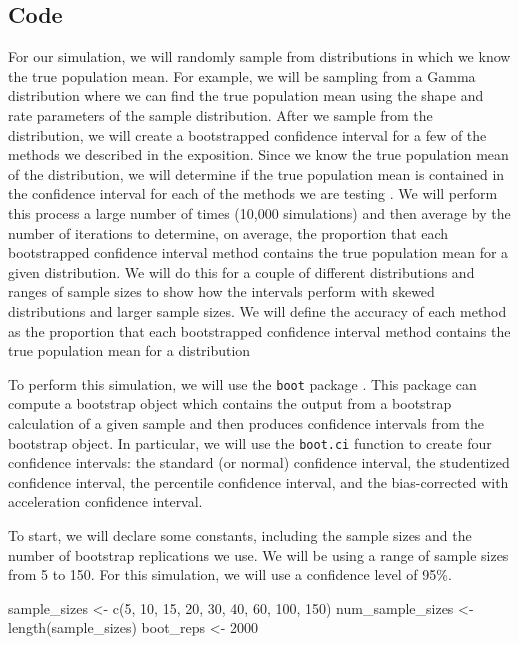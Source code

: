 \documentclass[12pt]{article}
\newenvironment{Shaded}{\begin{snugshade}}{\end{snugshade}}
\newcommand{\DecValTok}[1]{\textcolor[rgb]{0.00,0.00,0.81}{#1}}
\newcommand{\FunctionTok}[1]{\textcolor[rgb]{0.00,0.00,0.00}{#1}}
\newcommand{\NormalTok}[1]{#1}
\newcommand{\OtherTok}[1]{\textcolor[rgb]{0.56,0.35,0.01}{#1}}
\begin{document}
\hypertarget{code}{%
\subsection{Code}\label{code}}

For our simulation, we will randomly sample from distributions in which
we know the true population mean. For example, we will be sampling from
a Gamma distribution where we can find the true population mean using
the shape and rate parameters of the sample distribution. After we
sample from the distribution, we will create a bootstrapped confidence
interval for a few of the methods we described in the exposition. Since
we know the true population mean of the distribution, we will determine
if the true population mean is contained in the confidence interval for
each of the methods we are testing \citep{Guillaume21}. We will perform
this process a large number of times (10,000 simulations) and then
average by the number of iterations to determine, on average, the
proportion that each bootstrapped confidence interval method contains
the true population mean for a given distribution. We will do this for a
couple of different distributions and ranges of sample sizes to show how
the intervals perform with skewed distributions and larger sample sizes.
We will define the accuracy of each method as the proportion that each
bootstrapped confidence interval method contains the true population
mean for a distribution

To perform this simulation, we will use the \texttt{boot} package
\citep{boot}. This package can compute a bootstrap object which contains
the output from a bootstrap calculation of a given sample and then
produces confidence intervals from the bootstrap object. In particular,
we will use the \texttt{boot.ci} function to create four confidence
intervals: the standard (or normal) confidence interval, the studentized
confidence interval, the percentile confidence interval, and the
bias-corrected with acceleration confidence interval.

To start, we will declare some constants, including the sample sizes and
the number of bootstrap replications we use. We will be using a range of
sample sizes from 5 to 150. For this simulation, we will use a
confidence level of 95\%.

\begin{Shaded}
\begin{Highlighting}[]
\NormalTok{sample\_sizes }\OtherTok{\textless{}{-}} \FunctionTok{c}\NormalTok{(}\DecValTok{5}\NormalTok{, }\DecValTok{10}\NormalTok{, }\DecValTok{15}\NormalTok{, }\DecValTok{20}\NormalTok{, }\DecValTok{30}\NormalTok{, }\DecValTok{40}\NormalTok{, }\DecValTok{60}\NormalTok{, }\DecValTok{100}\NormalTok{, }\DecValTok{150}\NormalTok{)}
\NormalTok{num\_sample\_sizes }\OtherTok{\textless{}{-}} \FunctionTok{length}\NormalTok{(sample\_sizes)}
\NormalTok{boot\_reps }\OtherTok{\textless{}{-}} \DecValTok{2000}
\end{Highlighting}
\end{Shaded}
\end{document}
